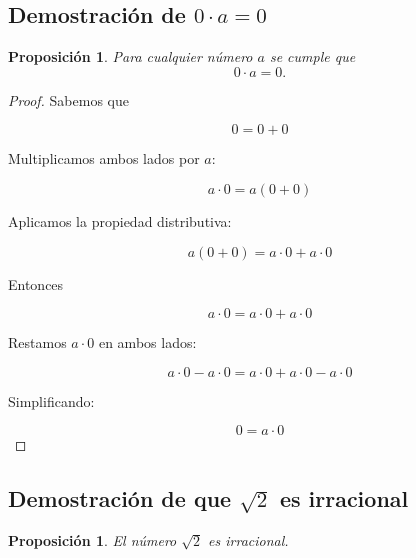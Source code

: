 \documentclass[12pt,final]{report}
\theoremstyle{plain}
\newtheorem{proposition}[theorem]{Proposición}
\theoremstyle{definition}
\begin{document}
\newpage

\subsection{Demostración de $0\cdot a = 0$}

\begin{proposition}
Para cualquier número $a$ se cumple que
\[
0\cdot a = 0.
\]
\end{proposition}

\begin{proof}

Sabemos que

\[
0 = 0+0
\]

Multiplicamos ambos lados por $a$:

\[
a\cdot0 = a(0+0)
\]

Aplicamos la propiedad distributiva:

\[
a(0+0) = a\cdot0 + a\cdot0
\]

Entonces

\[
a\cdot0 = a\cdot0 + a\cdot0
\]

Restamos $a\cdot0$ en ambos lados:

\[
a\cdot0 - a\cdot0 = a\cdot0 + a\cdot0 - a\cdot0
\]

Simplificando:

\[
0 = a\cdot0
\]

\end{proof}

\newpage

\subsection{Demostración de que $\sqrt{2}$ es irracional}

\begin{proposition}
El número $\sqrt{2}$ es irracional.
\end{proposition}
\end{document}
